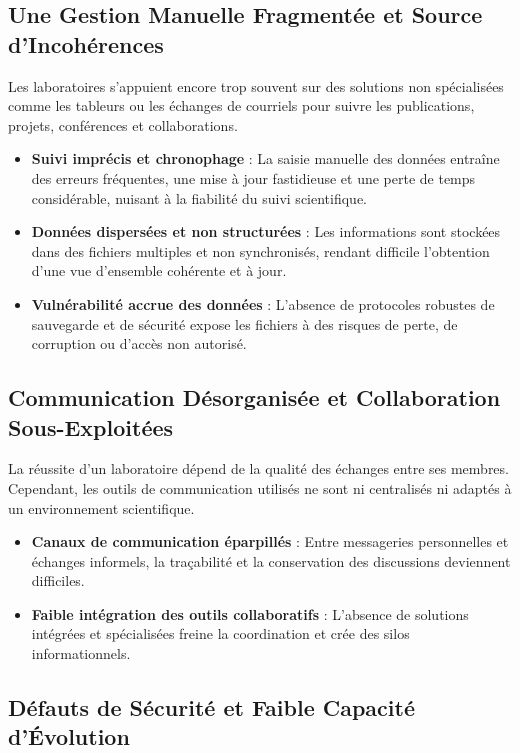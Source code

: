 \documentclass{rapportPfe}
\begin{document}
\subsection{Une Gestion Manuelle Fragmentée et Source d’Incohérences}

Les laboratoires s’appuient encore trop souvent sur des solutions non spécialisées comme les tableurs ou les échanges de courriels pour suivre les publications, projets, conférences et collaborations.

\begin{itemize}
  \item \textbf{Suivi imprécis et chronophage} : La saisie manuelle des données entraîne des erreurs fréquentes, une mise à jour fastidieuse et une perte de temps considérable, nuisant à la fiabilité du suivi scientifique.
  \item \textbf{Données dispersées et non structurées} : Les informations sont stockées dans des fichiers multiples et non synchronisés, rendant difficile l’obtention d’une vue d’ensemble cohérente et à jour.
  \item \textbf{Vulnérabilité accrue des données} : L’absence de protocoles robustes de sauvegarde et de sécurité expose les fichiers à des risques de perte, de corruption ou d’accès non autorisé.
\end{itemize}

\subsection{Communication Désorganisée et Collaboration Sous-Exploitées}

La réussite d’un laboratoire dépend de la qualité des échanges entre ses membres. Cependant, les outils de communication utilisés ne sont ni centralisés ni adaptés à un environnement scientifique.

\begin{itemize}
  \item \textbf{Canaux de communication éparpillés} : Entre messageries personnelles et échanges informels, la traçabilité et la conservation des discussions deviennent difficiles.
  \item \textbf{Faible intégration des outils collaboratifs} : L'absence de solutions intégrées et spécialisées freine la coordination et crée des silos informationnels.
\end{itemize}

\subsection{Défauts de Sécurité et Faible Capacité d'Évolution}
\end{document}
